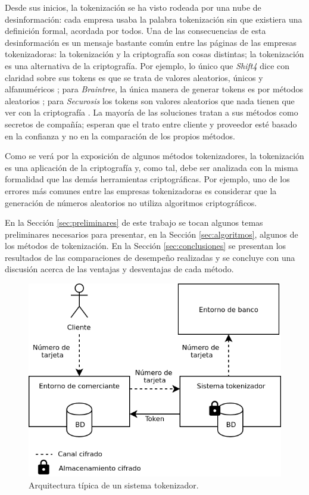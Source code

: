 
Desde sus inicios, la tokenización se ha visto rodeada por una nube de
desinformación: cada empresa usaba la palabra tokenización sin que existiera una
definición formal, acordada por todos. Una de las consecuencias de esta
desinformación es un mensaje bastante común entre las páginas de las empresas
tokenizadoras: la tokenización y la criptografía son cosas distintas; la
tokenización es una alternativa de la criptografía. Por ejemplo, lo único que
\textit{Shift4} dice con claridad sobre sus tokens es que se trata de valores
aleatorios, únicos y alfanuméricos \cite{shif4_uno}; para
\textit{Braintree}, la única manera de generar tokens es por métodos aleatorios
\cite{braintree_uno}; para \textit{Securosis} los tokens son valores aleatorios
que nada tienen que ver con la criptografía \cite{securosis}. La mayoría de las
soluciones tratan a sus métodos como secretos de compañía; esperan que el trato
entre cliente y proveedor esté basado en la confianza y no en la comparación de
los propios métodos.


Como se verá por la exposición de algunos métodos tokenizadores, la tokenización
es una aplicación de la criptografía y, como tal, debe ser analizada con la
misma formalidad que las demás herramientas criptográficas. Por ejemplo, uno de
los errores más comunes entre las empresas tokenizadoras es considerar que la generación de números aleatorios no utiliza algoritmos criptográficos.


En la Sección \ref{sec:preliminares} de este trabajo se tocan algunos temas
preliminares necesarios para presentar, en la Sección \ref{sec:algoritmos},
algunos de los métodos de tokenización. En la Sección \ref{sec:conclusiones} se
presentan los resultados de las comparaciones de desempeño realizadas y se
concluye con una discusión acerca de las ventajas y desventajas de cada método.


\begin{figure}
  \centering
  \includegraphics[width=0.8\linewidth]
    {algoritmos_tokenizadores/diagramas/sistema_tokenizador.png}
  \caption{Arquitectura típica de un sistema tokenizador.}
  \label{figura:arquitectura_tokenizacion}
\end{figure}
